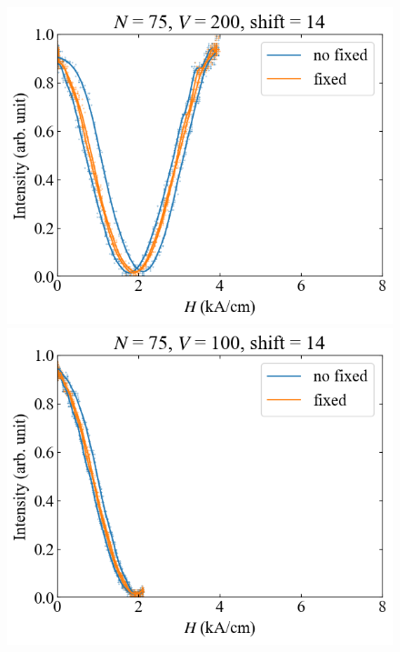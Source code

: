 \documentclass[9pt,dvipdfmx,a4paper]{jsarticle}
\begin{document}
\begin{figure}[H]
\begin{minipage}[t]{0.24\columnwidth}
        \centering
        \includegraphics[width = \columnwidth]{xy/11.png}
    \end{minipage}
    \hfill
    \begin{minipage}[t]{0.24\columnwidth}
        \centering
        \includegraphics[width = \columnwidth]{xy/12.png}
    \end{minipage}
\end{figure}
\end{document}

